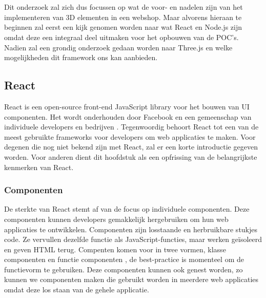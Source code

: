 \chapter{}%
\label{ch:stand-van-zaken}



Dit onderzoek zal zich dus focussen op wat de voor- en nadelen zijn van het implementeren van 3D elementen in een webshop. Maar alvorens hieraan te beginnen zal eerst een kijk genomen worden naar wat React en Node.js zijn omdat deze een integraal deel uitmaken voor het opbouwen van de POC's. Nadien zal een grondig onderzoek gedaan worden naar Three.js en welke mogelijkheden dit framework ons kan aanbieden.

\section{React}

React is een open-source front-end JavaScript library voor het bouwen van UI componenten. Het wordt onderhouden door Facebook en een gemeenschap van individuele developers en bedrijven \autocite{Bhupati2021}. Tegenwoordig behoort React tot een van de meest gebruikte frameworks voor developers om web applicaties te maken. Voor degenen die nog niet bekend zijn met React, zal er een korte introductie gegeven worden. Voor anderen dient dit hoofdstuk als een opfrissing van de belangrijkste kenmerken van React.

\subsection{Componenten}
De sterkte van React stemt af van de focus op individuele componenten. Deze componenten kunnen developers gemakkelijk hergebruiken om hun web applicaties te ontwikkelen. Componenten zijn losstaande en herbruikbare stukjes code. Ze vervullen dezelfde functie als JavaScript-functies, maar werken geïsoleerd en geven HTML terug. Compenten komen voor in twee vormen, klasse componenten en functie componenten , de best-practice is momenteel om de functievorm te gebruiken. \autocite{W3Schools2023} Deze componenten kunnen ook genest worden, zo kunnen we componenten maken die gebruikt worden in meerdere web applicaties omdat deze los staan van de gehele applicatie.

